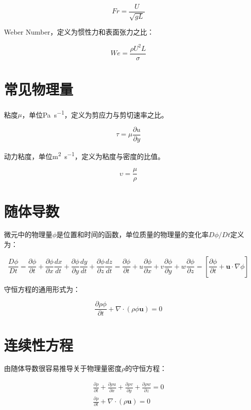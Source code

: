 \[Fr = \frac{U}{\sqrt{gL}}\]

Weber Number，定义为惯性力和表面张力之比：

\[We=\frac{\rho U^2 L}{\sigma}\]

\section{常见物理量}

粘度$ \mu $，单位\si{\pascal\per\second}，定义为剪应力与剪切速率之比。

\[\tau = \mu\frac{\partial u}{\partial y}\]

动力粘度，单位\si{\meter\squared\per\second}，定义为粘度与密度的比值。

\[\upsilon=\frac{\mu}{\rho} \] 

\section{随体导数}
微元中的物理量$ \phi $是位置和时间的函数，单位质量的物理量的变化率$ D\phi/Dt $定义为：

\begin{equation}
\frac{D\phi}{Dt} = \frac{\partial \phi}{\partial t}+\frac{\partial \phi}{\partial x}\frac{dx}{dt} + \frac{\partial \phi}{\partial y}\frac{dy}{dt} + \frac{\partial \phi}{\partial z}\frac{dz}{dt}=\frac{\partial \phi}{\partial t}+u\frac{\partial \phi}{\partial x}+v\frac{\partial \phi}{\partial y}+w\frac{\partial \phi}{\partial z}=\left[\frac{\partial \phi}{\partial t}+\bm{u}\cdot \nabla \phi\right]
\end{equation}

守恒方程的通用形式为：

\begin{equation}
\frac{\partial \rho\phi}{\partial t}+\nabla\cdot(\rho\phi\bm{u}) = 0
\end{equation}

\section{连续性方程}
由随体导数很容易推导关于物理量密度$ \rho $的守恒方程：

\begin{gather}
\frac{\partial \rho}{\partial t} + \frac{\partial \rho u}{\partial x} + \frac{\partial \rho v}{\partial y} + \frac{\partial \rho w}{\partial z} = 0 \\
\frac{\partial \rho}{\partial t} + \nabla \cdot (\rho\bm{u}) = 0
\end{gather}

